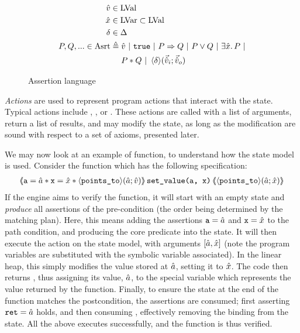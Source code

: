 \begin{figure}
	\begin{align*}
	\hat{v} &\in \text{LVal}\\
	\hat{x} &\in \text{LVar} \subset \text{LVal}\\
	\delta &\in \Delta \\
	P, Q, ... \in \text{Asrt} &\triangleq \hat{v} ~|~ \texttt{true} ~|~ P \Rightarrow Q ~|~ P \lor Q ~|~ \exists \hat{x} \ldotp P ~|\\
	&\quad~ P * Q ~|~ \left<\delta\right>\!(\vec{\hat{v}}_i;\vec{\hat{v}}_o)
	\end{align*}
	\caption{Assertion language}
	\label{fig:assertion-language}
\end{figure}

\emph{Actions} are used to represent program actions that interact with the state. Typical actions include \load{}, \store{}, \alloc{} or \free. These actions are called with a list of arguments, return a list of results, and may modify the state, as long as the modification are sound with respect to a set of axioms, presented later.

We may now look at an example of function, to understand how the state model is used. Consider the function  which has the following specification:
\begin{align*}%
\ESLtriple
	{\code{a}=\sym a * \code{x} = \sym x * \corepred{\pointsto}{\sym a}{\sym v}}
	{set\_value(a, x)}
	{\corepred{\pointsto}{\sym a}{\sym x}}
\end{align*}%
If the engine aims to verify the function, it will start with an empty state and \emph{produce} all assertions of the pre-condition (the order being determined by the matching plan). Here, this means adding the assertions $\texttt{a} = \hat{a}$ and $\texttt{x} = \hat{x}$ to the path condition, and producing the core predicate  into the state. It will then execute the action  on the state model, with arguments $[\hat{a}, \hat{x}]$ (note the program variables are substituted with the symbolic variable associated). In the linear heap, this simply modifies the value stored at $\hat{a}$, setting it to $\hat{x}$. The code then returns , thus assigning its value, $\hat{a}$, to the special variable  which represents the value returned by the function. Finally, to ensure the state at the end of the function matches the postcondition, the assertions are consumed; first asserting $\texttt{ret} = \hat{a}$ holds, and then consuming , effectively removing the binding from the state. All the above executes successfully, and the function is thus verified.

